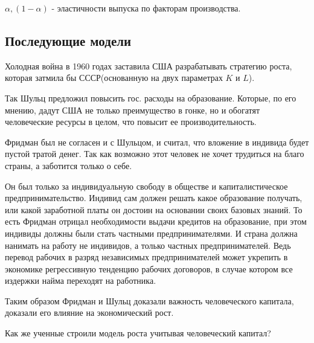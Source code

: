 \documentclass[reqno]{article}
\theoremstyle{definition}
\theoremstyle{definition}
\theoremstyle{definition}
\theoremstyle{definition}
\theoremstyle{definition}
\theoremstyle{definition}
\theoremstyle{definition}
\theoremstyle{definition}
\theoremstyle{definition}
\begin{document}
		$\alpha, (1 - \alpha)$ - эластичности выпуска по факторам производства.
		
		\subsection{Последующие модели}
			Холодная война в 1960 годах заставила США разрабатывать стратегию роста, которая затмила бы СССР(основанную на двух параметрах $K$ и $L$).
			
			Так Шульц предложил повысить гос. расходы на образование. Которые, по его мнению, дадут США не только преимущество в гонке, но и обогатят человеческие ресурсы в целом, что повысит ее производительность.
			
			Фридман был не согласен и с Шульцом, и считал, что вложение в индивида будет пустой тратой денег. Так как возможно этот человек не хочет трудиться на благо страны, а  заботится только о себе.
			
			Он был только за индивидуальную свободу в обществе и капиталистическое предпринимательство. Индивид сам должен решать какое образование получать, или какой заработной платы он достоин на основании своих базовых знаний. То есть Фридман отрицал необходимости выдачи кредитов на образование, при этом индивиды должны были стать частными предпринимателями. И страна должна нанимать на работу не индивидов, а только частных предпринимателей. Ведь перевод рабочих в разряд независимых предпринимателей может укрепить в экономике регрессивную тенденцию рабочих договоров, в случае котором все издержки найма переходят на работника.  
			
			Таким образом Фридман и Шульц доказали важность человеческого капитала, доказали его влияние на экономический рост.
			
			Как же ученные строили модель роста учитывая человеческий капитал?
			
\end{document}
